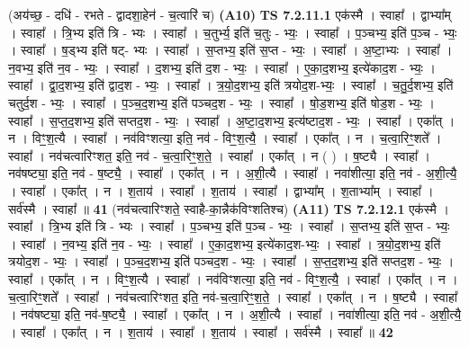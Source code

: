 \documentclass[17pt]{extarticle}
\begin{document}
                  \newline
                      (अय॑च्छ॒ - दधि॑ - रभते - द्वादशा॒हेन॑ - च॒त्वारि॑ च)  \textbf{(A10)} \newline \newline
                                \textbf{ TS 7.2.11.1} \newline
                  एक॑स्मै । स्वाहा᳚ । द्वाभ्या᳚म् । स्वाहा᳚ । त्रि॒भ्य इति॑ त्रि - भ्यः । स्वाहा᳚ । च॒तुर्भ्य॒ इति॑ च॒तुः - भ्यः॒ । स्वाहा᳚ । प॒ञ्चभ्य॒ इति॑ प॒ञ्च - भ्यः॒ । स्वाहा᳚ । ष॒ड्भ्य इति॑ षट्- भ्यः । स्वाहा᳚ । स॒प्तभ्य॒ इति॑ स॒प्त - भ्यः॒ । स्वाहा᳚ । अ॒ष्टा॒भ्यः । स्वाहा᳚ । न॒वभ्य॒ इति॑ न॒व - भ्यः॒ । स्वाहा᳚ । द॒शभ्य॒ इति॑ द॒श - भ्यः॒ । स्वाहा᳚ । ए॒का॒द॒शभ्य॒ इत्ये॑काद॒श - भ्यः॒ । स्वाहा᳚ । द्वा॒द॒शभ्य॒ इति॑ द्वाद॒श - भ्यः॒ । स्वाहा᳚ । त्र॒यो॒द॒शभ्य॒ इति॑ त्रयोद॒श-भ्यः॒ । स्वाहा᳚ । च॒तु॒र्द॒शभ्य॒ इति॑ चतुर्द॒श - भ्यः॒ । स्वाहा᳚ । प॒ञ्च॒द॒शभ्य॒ इति॑ पञ्चद॒श - भ्यः॒ । स्वाहा᳚ । षो॒ड॒शभ्य॒ इति॑ षोड॒श - भ्यः॒ । स्वाहा᳚ । स॒प्त॒द॒शभ्य॒ इति॑ सप्तद॒श - भ्यः॒ । स्वाहा᳚ । अ॒ष्टा॒द॒शभ्य॒ इत्य॑ष्टाद॒श - भ्यः॒ । स्वाहा᳚ । एका᳚त् । न । विꣳ॒॒श॒त्यै । स्वाहा᳚ । नव॑विꣳशत्या॒ इति॒ नव॑ - विꣳ॒॒श॒त्यै॒ । स्वाहा᳚ । एका᳚त् । न । च॒त्वा॒रिꣳ॒॒शते᳚ । स्वाहा᳚ । नव॑चत्वारिꣳशत॒ इति॒ नव॑ - च॒त्वा॒रिꣳ॒॒श॒ते॒ । स्वाहा᳚ । एका᳚त् । न ( ) । ष॒ष्ट्यै । स्वाहा᳚ । नव॑षष्ट्या॒ इति॒ नव॑ - ष॒ष्ट्यै॒ । स्वाहा᳚ । एका᳚त् । न । अ॒शी॒त्यै । स्वाहा᳚ । नवा॑शीत्या॒ इति॒ नव॑ - अ॒शी॒त्यै॒ । स्वाहा᳚ । एका᳚त् । न । श॒ताय॑ । स्वाहा᳚ । श॒ताय॑ । स्वाहा᳚ । द्वाभ्या᳚म् । श॒ताभ्या᳚म् । स्वाहा᳚ । सर्व॑स्मै । स्वाहा᳚ ॥ \textbf{  41} \newline
                  \newline
                      (नव॑चत्वारिꣳशते॒ स्वाहै-का॒न्नैक॑विꣳशतिश्च)  \textbf{(A11)} \newline \newline
                                \textbf{ TS 7.2.12.1} \newline
                  एक॑स्मै । स्वाहा᳚ । त्रि॒भ्य इति॑ त्रि - भ्यः । स्वाहा᳚ । प॒ञ्चभ्य॒ इति॑ प॒ञ्च - भ्यः॒ । स्वाहा᳚ । स॒प्तभ्य॒ इति॑ स॒प्त - भ्यः॒ । स्वाहा᳚ । न॒वभ्य॒ इति॑ न॒व - भ्यः॒ । स्वाहा᳚ । ए॒का॒द॒शभ्य॒ इत्ये॑काद॒श-भ्यः॒ । स्वाहा᳚ । त्र॒यो॒द॒शभ्य॒ इति॑ त्रयोद॒श - भ्यः॒ । स्वाहा᳚ । प॒ञ्च॒द॒शभ्य॒ इति॑ पञ्चद॒श - भ्यः॒ । स्वाहा᳚ । स॒प्त॒द॒शभ्य॒ इति॑ सप्तद॒श - भ्यः॒ । स्वाहा᳚ । एका᳚त् । न । विꣳ॒॒श॒त्यै । स्वाहा᳚ । नव॑विꣳशत्या॒ इति॒ नव॑ - विꣳ॒॒श॒त्यै॒ । स्वाहा᳚ । एका᳚त् । न । च॒त्वा॒रिꣳ॒॒शते᳚ । स्वाहा᳚ । नव॑चत्वारिꣳशत॒ इति॒ नव॑-च॒त्वा॒रिꣳ॒॒श॒ते॒ । स्वाहा᳚ । एका᳚त् । न । ष॒ष्ट्यै । स्वाहा᳚ । नव॑षष्ट्या॒ इति॒ नव॑-ष॒ष्ट्यै॒ । स्वाहा᳚ । एका᳚त् । न । अ॒शी॒त्यै । स्वाहा᳚ । नवा॑शीत्या॒ इति॒ नव॑ - अ॒शी॒त्यै॒ । स्वाहा᳚ । एका᳚त् । न । श॒ताय॑ । स्वाहा᳚ । श॒ताय॑ । स्वाहा᳚ । सर्व॑स्मै । स्वाहा᳚ ॥ \textbf{  42} \newline
\end{document}
